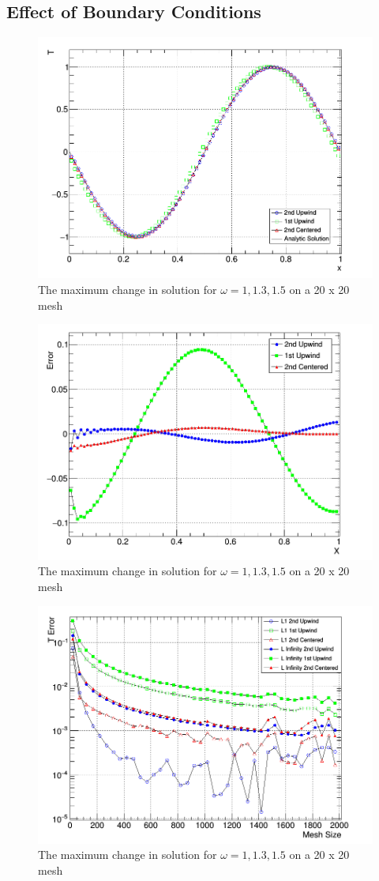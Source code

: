 \documentclass[paper=a4, fontsize=11pt, abstract=on]{scrartcl}
\numberwithin{equation}{section}		%
\numberwithin{figure}{section}			%
\numberwithin{table}{section}				%
\begin{document}
\subsection{Effect of Boundary Conditions}


\begin{figure}[H]
\centering
\includegraphics[width=0.8\linewidth]{3a1}
\caption{The maximum change in solution for $\omega = 1, 1.3, 1.5$ on a 20 x 20 mesh}
\label{q4}
\end{figure}

\begin{figure}[H]
\centering
\includegraphics[width=0.8\linewidth]{3a2}
\caption{The maximum change in solution for $\omega = 1, 1.3, 1.5$ on a 20 x 20 mesh}
\label{q4}
\end{figure}

\begin{figure}[H]
\centering
\includegraphics[width=0.8\linewidth]{3a33}
\caption{The maximum change in solution for $\omega = 1, 1.3, 1.5$ on a 20 x 20 mesh}
\label{q4}
\end{figure}
\end{document}
